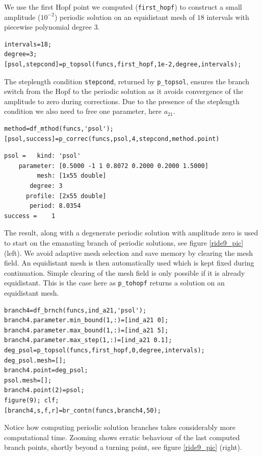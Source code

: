 \documentclass[10pt]{scrartcl}
\newcommand{\blist}[1]{\mbox{\lstinline!#1!}}
\begin{document}
We use the first Hopf point we computed (\blist{first_hopf}) to
construct a small amplitude ($10^{-2}$) periodic solution on an
equidistant mesh of $18$ intervals with piecewise polynomial degree
$3$.  
\begin{lstlisting}
intervals=18;
degree=3;
[psol,stepcond]=p_topsol(funcs,first_hopf,1e-2,degree,intervals);  
\end{lstlisting}
The steplength condition \blist{stepcond}, returned by
\blist{p_topsol}, ensures the branch switch from the Hopf to the
periodic solution as it avoids convergence of the amplitude to zero
during corrections. Due to the presence of the steplength condition we
also need to free one parameter, here $a_{21}$.
\begin{lstlisting}
method=df_mthod(funcs,'psol');
[psol,success]=p_correc(funcs,psol,4,stepcond,method.point)  
\end{lstlisting}
{\small
\begin{verbatim}
psol =   kind: 'psol'
    parameter: [0.5000 -1 1 0.8072 0.2000 0.2000 1.5000]
         mesh: [1x55 double]
       degree: 3
      profile: [2x55 double]
       period: 8.0354
success =    1
\end{verbatim}}
The result, along with a degenerate periodic solution with amplitude
zero is used to start on the emanating branch of periodic solutions,
see figure \ref{ride9_pic} (left). We avoid adaptive 
mesh selection and save memory by clearing the mesh field. 
An equidistant mesh is then automatically used which is kept
fixed during continuation. Simple clearing of the mesh field
is only  possible if it is already equidistant. This is the case
here as \blist{p_tohopf} returns a solution on an
equidistant mesh.
\begin{lstlisting}
branch4=df_brnch(funcs,ind_a21,'psol');
branch4.parameter.min_bound(1,:)=[ind_a21 0];
branch4.parameter.max_bound(1,:)=[ind_a21 5];
branch4.parameter.max_step(1,:)=[ind_a21 0.1];
deg_psol=p_topsol(funcs,first_hopf,0,degree,intervals);
deg_psol.mesh=[];
branch4.point=deg_psol;
psol.mesh=[];
branch4.point(2)=psol;
figure(9); clf;
[branch4,s,f,r]=br_contn(funcs,branch4,50);
\end{lstlisting}
Notice how computing periodic solution branches takes considerably
more computational time.  Zooming shows erratic behaviour of the last
computed branch points, shortly beyond a turning point, see figure
\ref{ride9_pic} (right).
\end{document}

